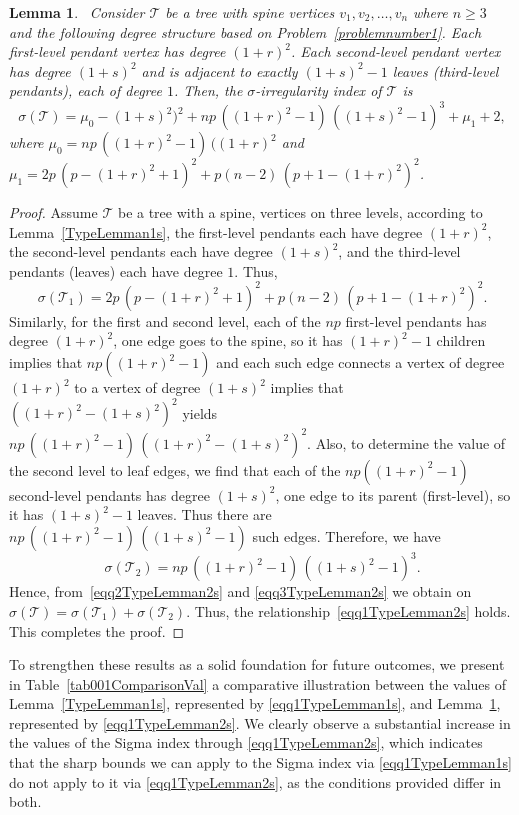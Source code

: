 \documentclass[12pt, a4paper]{article}
\theoremstyle{plain}  %
\newtheorem{lemma}[theorem]{Lemma}
\theoremstyle{definition}  %
\newcommand{\TT}{\mathcal{T}}
\begin{document}
\begin{lemma}~\label{TypeLemman2s}
Consider $\TT$ be a tree with spine vertices $v_1,v_2,\dots,v_n$ where $n\geqslant 3$ and the following degree structure based on Problem~\ref{problemnumber1}. Each first-level pendant vertex has degree $(1+r)^2$. Each second-level pendant vertex has degree $(1+s)^2$ and is adjacent to exactly $(1+s)^2 - 1$ leaves (third-level pendants), each of degree $1$. Then, the $\sigma$-irregularity index of $\TT$ is
\begin{equation}~\label{eqq1TypeLemman2s}
\sigma(\TT)=\mu_0-(1+s)^2)^2+np\,((1+r)^2-1)\,((1+s)^2-1)^3+\mu_1+2,
\end{equation}
where $\mu_0=np\,((1+r)^2-1)\,((1+r)^2$ and $\mu_1=2p\,(p-(1+r)^2+1)^2+p(n-2)\,(p+1-(1+r)^2)^2$.
\end{lemma}
\begin{proof}
Assume $\TT$ be a tree with a spine, vertices on three levels, according to Lemma~\ref{TypeLemman1s}, the first-level pendants each have degree $(1+r)^2$, the second-level pendants each have degree $(1+s)^2$, and the third-level pendants (leaves) each have degree $1$. Thus, 
\begin{equation}~\label{eqq2TypeLemman2s}
\sigma(\TT_1)=2p\,(p-(1+r)^2+1)^2+p(n-2)\,(p+1-(1+r)^2)^2.
\end{equation}
Similarly, for the first and second level, each of the $np$ first-level pendants has degree $(1+r)^2$, one edge goes to the spine, so it has $(1+r)^2- 1$ children implies that $np((1+r)^2-1)$ and  each such edge connects a vertex of degree $(1+r)^2$ to a vertex of degree $(1+s)^2$ implies that $((1+r)^2-(1+s)^2)^2$ yields $np\,((1+r)^2-1)\,((1+r)^2-(1+s)^2)^2.$ Also, to determine the value of the second level to leaf edges, we find that each of the $np((1+r)^2-1)$ second-level pendants has degree $(1+s)^2$, one edge to its parent (first-level), so it has $(1+s)^2-1$ leaves. Thus there are
$np\,((1+r)^2-1)\,((1+s)^2-1)$ such edges. Therefore, we have 
\begin{equation}~\label{eqq3TypeLemman2s}
\sigma(\TT_2)=np\,((1+r)^2-1)\,((1+s)^2-1)^3.
\end{equation}
Hence, from~\eqref{eqq2TypeLemman2s} and \eqref{eqq3TypeLemman2s} we obtain on $\sigma(\TT)=\sigma(\TT_1)+\sigma(\TT_2).$ Thus, the relationship~\eqref{eqq1TypeLemman2s} holds. This completes the proof.
\end{proof}
To strengthen these results as a solid foundation for future outcomes, we present in Table~\ref{tab001ComparisonVal} a comparative illustration between the values of Lemma~\ref{TypeLemman1s}, represented by \eqref{eqq1TypeLemman1s}, and Lemma~\ref{TypeLemman2s}, represented by \eqref{eqq1TypeLemman2s}. 
We clearly observe a substantial increase in the values of the Sigma index through \eqref{eqq1TypeLemman2s}, which indicates that the sharp bounds we can apply to the Sigma index via \eqref{eqq1TypeLemman1s} do not apply to it via \eqref{eqq1TypeLemman2s}, as the conditions provided differ in both.
\end{document}
